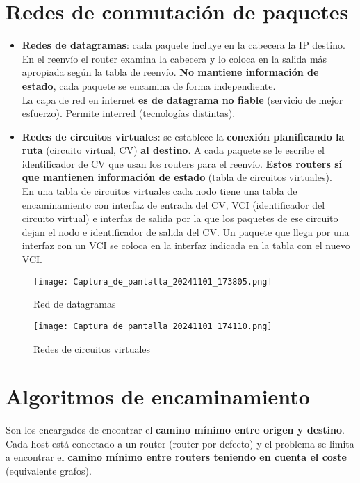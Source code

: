 \documentclass{article}
\begin{document}
\section{Redes de conmutación de paquetes}
\begin{itemize}
    \item \textbf{Redes de datagramas}: cada paquete incluye en la cabecera la IP destino. En el reenvío el router examina la cabecera y lo coloca en la salida más apropiada según la tabla de reenvío. \textbf{No mantiene información de estado}, cada paquete se encamina de forma independiente. \\
    La capa de red en internet \textbf{es de datagrama no fiable} (servicio de mejor esfuerzo). Permite interred (tecnologías distintas).

    \item \textbf{Redes de circuitos virtuales}: se establece la \textbf{conexión planificando la ruta} (circuito virtual, CV) \textbf{al destino}. A cada paquete se le escribe el identificador de CV que usan los routers para el reenvío. \textbf{Estos routers sí que mantienen información de estado} (tabla de circuitos virtuales). \\
    En una tabla de circuitos virtuales cada nodo tiene una tabla de encaminamiento con interfaz de entrada del CV, VCI (identificador del circuito virtual) e interfaz de salida por la que los paquetes de ese circuito dejan el nodo e identificador de salida del CV. Un paquete que llega por una interfaz con un VCI se coloca en la interfaz indicada en la
    tabla con el nuevo VCI.
\end{itemize}

\begin{figure}[h]
    \centering
    \texttt{[image: Captura\_de\_pantalla\_20241101\_173805.png]}
    \caption{Red de datagramas}
    \label{fig:etiqueta}
\end{figure}


\begin{figure}[h]
    \centering
    \texttt{[image: Captura\_de\_pantalla\_20241101\_174110.png]}
    \caption{Redes de circuitos virtuales}
    \label{fig:etiqueta}
\end{figure}

\newpage

\section{Algoritmos de encaminamiento}
Son los encargados de encontrar el \textbf{camino mínimo entre origen y destino}. Cada host está conectado a un router (router por defecto) y el problema se limita a encontrar el \textbf{camino mínimo entre routers teniendo en cuenta el coste} (equivalente grafos). \\
\end{document}
